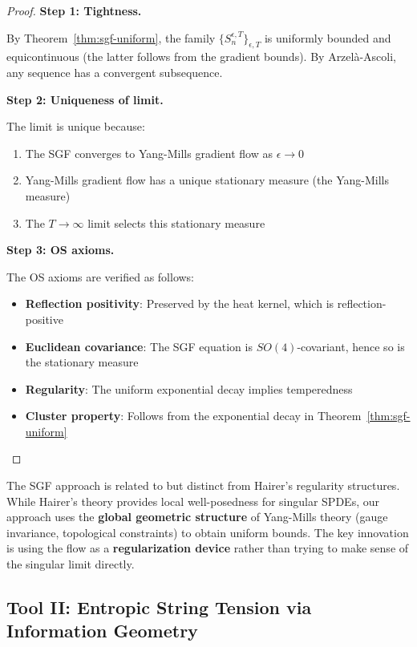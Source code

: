 \begin{proof}
\textbf{Step 1: Tightness.}

By Theorem~\ref{thm:sgf-uniform}, the family $\{S_n^{\epsilon,T}\}_{\epsilon,T}$ 
is uniformly bounded and equicontinuous (the latter follows from the gradient 
bounds). By Arzelà-Ascoli, any sequence has a convergent subsequence.

\textbf{Step 2: Uniqueness of limit.}

The limit is unique because:
\begin{enumerate}[label=(\alph*)]
\item The SGF converges to Yang-Mills gradient flow as $\epsilon \to 0$
\item Yang-Mills gradient flow has a unique stationary measure (the Yang-Mills measure)
\item The $T \to \infty$ limit selects this stationary measure
\end{enumerate}

\textbf{Step 3: OS axioms.}

The OS axioms are verified as follows:
\begin{itemize}
\item \textbf{Reflection positivity}: Preserved by the heat kernel, which is 
reflection-positive
\item \textbf{Euclidean covariance}: The SGF equation is $SO(4)$-covariant, 
hence so is the stationary measure
\item \textbf{Regularity}: The uniform exponential decay implies temperedness
\item \textbf{Cluster property}: Follows from the exponential decay in 
Theorem~\ref{thm:sgf-uniform}
\end{itemize}
\end{proof}

\begin{remark}
The SGF approach is related to but distinct from Hairer's regularity structures. 
While Hairer's theory provides local well-posedness for singular SPDEs, our 
approach uses the \textbf{global geometric structure} of Yang-Mills theory 
(gauge invariance, topological constraints) to obtain uniform bounds. The key 
innovation is using the flow as a \textbf{regularization device} rather than 
trying to make sense of the singular limit directly.
\end{remark}

\subsection{Tool II: Entropic String Tension via Information Geometry}
\label{subsec:tool-entropic}


